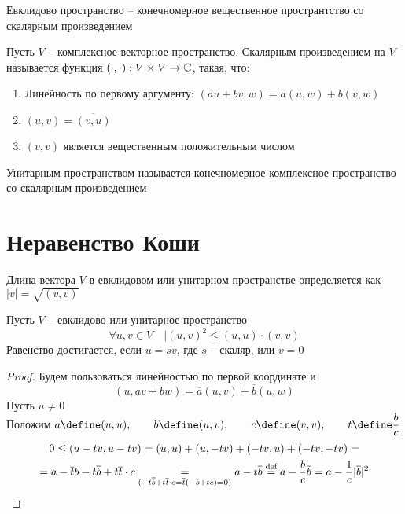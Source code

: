\begin{definition}
	Евклидово пространство -- конечномерное вещественное пространтство со скалярным произведением
\end{definition}

\begin{definition}
	Пусть $ V $ -- комплексное векторное пространство. Скалярным произведением на $ V $ называется функция $ (\cdot, \cdot) : V \times V \to \mathbb{C} $, такая, что:
    \begin{enumerate}
    	\item Линейность по первому аргументу: $ (au + bv, w) = a(u, w) + b(v, w) $
        \item $ (u, v) = \overline{(v, u)} $
        \item $ (v, v) $ является вещественным положительным числом
    \end{enumerate}
\end{definition}

\begin{definition}
	Унитарным пространством называется конечномерное комплексное пространство со скалярным произведением
\end{definition}

\section{Неравенство Коши}

\begin{definition}
    Длина вектора $ V $ в евклидовом или унитарном пространстве определяется как $ |v| = \sqrt{(v, v)} $
\end{definition}

\begin{theorem}
	Пусть $ V $ -- евклидово или унитарное пространство
    $$ \forall u, v \in V \quad |(u, v)^2 \le (u, u) \cdot (v, v) $$
    Равенство достигается, если $ u = sv $, где $ s $ -- скаляр, или $ v = 0 $
\end{theorem}

\begin{proof}
    Будем пользоваться линейностью по первой координате и
    $$ (u, av + bw) = \overline{a}(u, v) + \overline{b}(u, w) $$
    Пусть $ u \ne 0 $ \\
    Положим $ a \define (u, u), \qquad b \define (u, v), \qquad c \define (v, v), \qquad t \define \dfrac{b}c $
    \begin{multline*}
        0 \le (u - tv, u - tv) = (u, u) + (u, -tv) + (-tv, u) + (-tv, -tv) = \\ = a - \overline{t}b - t\overline{b} + t\overline{t} \cdot c \underset{(-t\overline{b} + t\overline{t} \cdot c = \overline{t}(-b + tc) = 0)}= a - t\overline{b} \stackrel{\text{def}}{=} a - \frac{b}c\overline{b} = a - \frac1c|\overline{b}|^2
    \end{multline*}
\end{proof}
